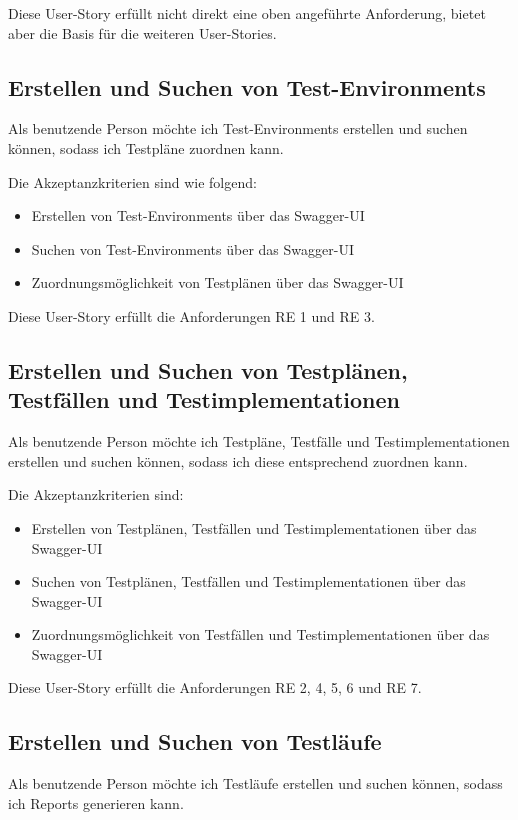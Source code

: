 \documentclass[a4paper, fontsize=11pt, parskip=half, twoside, headings=openright]{scrreprt}
\begin{document}
	Diese User-Story erfüllt nicht direkt eine oben angeführte Anforderung, bietet aber die Basis für die weiteren User-Stories.
	
	\subsection{Erstellen und Suchen von Test-Environments}
	Als benutzende Person möchte ich Test-Environments erstellen und suchen können, sodass ich Testpläne zuordnen kann.
	
	Die Akzeptanzkriterien sind wie folgend:
	\begin{itemize}
		\item Erstellen von Test-Environments über das Swagger-UI
		\item Suchen von Test-Environments über das Swagger-UI
		\item Zuordnungsmöglichkeit von Testplänen über das Swagger-UI
	\end{itemize}

	Diese User-Story erfüllt die Anforderungen RE 1 und RE 3.

	\subsection{Erstellen und Suchen von Testplänen, Testfällen und Testimplementationen}
	Als benutzende Person möchte ich Testpläne, Testfälle und Testimplementationen erstellen und suchen können, sodass ich diese entsprechend zuordnen kann.
	
	Die Akzeptanzkriterien sind:
	\begin{itemize}
		\item Erstellen von Testplänen, Testfällen und Testimplementationen über das Swagger-UI
		\item Suchen von Testplänen, Testfällen und Testimplementationen über das Swagger-UI
		\item Zuordnungsmöglichkeit von Testfällen und Testimplementationen über das Swagger-UI
	\end{itemize}

	Diese User-Story erfüllt die Anforderungen RE 2, 4, 5, 6 und RE 7.
	
	\subsection{Erstellen und Suchen von Testläufe}
	Als benutzende Person möchte ich Testläufe erstellen und suchen können, sodass ich Reports generieren kann.
	
\end{document}
